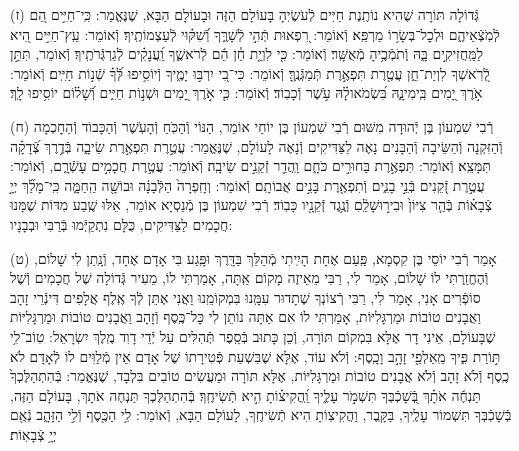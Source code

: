 \documentclass[twoside, openany, parskip=half, 11pt]{book}
\begin{document}
(ז)
גְּֿדוֹלָה תּוֹרָה שֶׁהִיא נוֹתֶֽנֶת חַיִּים לְֿעֹשֶׂיֽהָ בָּעוֹלָם הַזֶּה וּבָעוֹלָם הַבָּא, שֶׁנֶּאֱמַר: כִּֽי־חַיִּ֣ים הֵ֭ם לְֿמֹֽצְֿאֵיהֶ֑ם וּלְכׇל־בְּשָׂר֥וֹ מַרְפֵּֽא׃ וְֿאוֹמֵר: רִ֭פְאוּת תְּֿהִ֣י לְֿשָׁרֶּ֑ךָ וְֿ֝שִׁקּ֗וּי לְֿעַצְמוֹתֶֽיךָ׃ וְֿאוֹמֵר: עֵֽץ־חַיִּ֣ים הִ֭יא לַמַּֽחֲזִיקִ֣ים בָּ֑הּ וְֽֿתֹמְֿכֶ֥יהָ מְֿאֻשָּֽׁר׃ וְֿאוֹמֵר: כִּ֤י לִוְיַ֤ת חֵ֓ן הֵ֬ם לְֿרֹאשֶׁ֑ךָ וַֽ֝עֲנָקִ֗ים לְֿגַרְגְּֿרֹתֶֽיךָ׃ וְֿאוֹמֵר, תִּתֵּ֣ן לְֿ֭רֹֽאשְׁךָ לִוְיַת־חֵ֑ן עֲטֶ֖רֶת תִּפְאֶ֣רֶת תְּֿמַגְּֿנֶֽךָּ׃ וְֿאוֹמֵר: כִּי־בִ֭י יִרְבּ֣וּ יָמֶ֑יךָ וְֿיוֹסִ֥יפוּ לְּֿ֝ךָ֗ שְֿׁנ֣וֹת חַיִּֽים׃ וְֿאוֹמֵר: אֹ֣רֶךְ יָ֭מִים בִּֽימִינָ֑הּ בִּ֝שְׂמֹאולָ֗הּ עֹ֣שֶׁר וְֿכָבֽוֹד׃ וְֿאוֹמֵר: כִּ֤י אֹ֣רֶךְ יָ֭מִים וּשְׁנ֣וֹת חַיִּ֑ים וְֿ֝שָׁל֗וֹם יוֹסִ֥יפוּ לָֽךְ׃

(ח)
רְֿבִי שִׁמְעוֹן בֶּן יְֿהוּדָה מִשּׁוּם רְֿבִי שִׁמְעוֹן בֶּן יוֹחַי אוֹמֵר, הַנּוֹי וְֿהַכֹּֽחַ וְֿהָעֹֽשֶׁר וְֿהַכָּבוֹד וְֿהַחׇכְמָה וְֿהַזִּקְנָה וְֿהַשֵּׂיבָה וְֿהַבָּנִים נָאֶה לַצַּדִּיקִים וְֿנָאֶה לָעוֹלָם, שֶׁנֶּאֱמַר: עֲטֶ֣רֶת תִּפְאֶ֣רֶת שֵׂיבָ֑ה בְּֿדֶ֥רֶךְ צְֿ֝דָקָ֗ה תִּמָּצֵֽא׃ וְֿאוֹמֵר: תִּפְאֶ֣רֶת בַּחוּרִ֣ים כֹּחָ֑ם וַֽהֲדַ֖ר זְֿקֵנִ֣ים שֵׂיבָֽה׃ וְֿאוֹמֵר: עֲטֶ֣רֶת חֲכָמִ֣ים עָשְֿׁרָ֑ם, וְֿאוֹמֵר: עֲטֶ֣רֶת זְֿ֭קֵנִים בְּֿנֵ֣י בָנִ֑ים וְֿתִפְאֶ֖רֶת בָּנִ֣ים אֲבוֹתָֽם׃ וְֿאוֹמֵר: וְחָֽפְרָה֙ הַלְּֿבָנָ֔ה וּבוֹשָׁ֖ה הַֽחַמָּ֑ה כִּֽי־מָלַ֞ךְ יְיָ֣ צְֿבָא֗וֹת בְּֿהַ֤ר צִיּוֹן֙ וּבִיר֣וּשָׁלַֽ֔םִ וְֿנֶ֥גֶד זְֿקֵנָ֖יו כָּבֽוֹד׃ רְֿבִי שִׁמְעוֹן בֶּן מְֿנַסְיָא אוֹמֵר, אֵלּוּ שֶֽׁבַע מִדּוֹת שֶׁמָּנוּ חֲכָמִים לַצַּדִּיקִים, כֻּלָּם נִתְקַיְּֿמוּ בְּֿרַבִּי וּבְבָנָיו:

\vspace{0.5\baselineskip}

(ט)
אָמַר רְֿבִי יוֹסֵי בֶּן קִסְמָא, פַּֽעַם אֶחָת הָיִֽיתִי מְֿהַלֵּךְ בַּדָּֽרֶךְ וּפָּֽגַע בִּי אָדָם אֶחָד, וְֿנָֽתַן לִי שָׁלוֹם, וְֿהֶחֱזַֽרְתִּי לוֹ שָׁלוֹם, אָמַר לִי, רַבִּי מֵאֵיזֶה מָקוֹם אַֽתָּה, אָמַרְתִּי לוֹ, מֵעִיר גְּֿדוֹלָה שֶׁל חֲכָמִים וְֿשֶׁל סוֹפְֿרִים אָנִי, אָמַר לִי, רַבִּי רְֿצוֹנְךָ שֶׁתָדוּר עִמָּֽנוּ בִּמְקוֹמֵֽנוּ וַאֲנִי אֶתֵּן לְֿךָ אֶֽלֶף אֲלָפִים דִּינְֿרֵי זָהָב וַאֲבָנִים טוֹבוֹת וּמַרְגָּלִיּוֹת, אָמַרְתִּי לוֹ אִם אַתָּה נוֹתֵן לִי כׇּל־כֶּֽסֶף וְֿזָהָב וַאֲבָנִים טוֹבוֹת וּמַרְגָּלִיּוֹת שֶׁבָּעוֹלָם, אֵינִי דָר אֶלָּא בִּמְקוֹם תּוֹרָה, וְֿכֵן כָּתוּב בְּֿסֵֽפֶר תְּֿהִלִּים עַל יְֿדֵי דָוִד מֶֽלֶךְ יִשְׂרָאֵל: טֽוֹב־לִ֥י תּ֣וֹרַת פִּ֑יךָ מֵֽאַלְפֵ֖י זָהָ֣ב וָכָֽסֶף: וְֿלֹא עוֹד, אֶלָּא שֶׁבִּשְׁעַת פְּֿטִירָתוֹ שֶׁל אָדָם אֵין מְֿלַוִּים לוֹ לְֿאָדָם לֹא כֶֽסֶף וְֿלֹא זָהָב וְֿלֹא אֲבָנִים טוֹבוֹת וּמַרְגָּלִיּוֹת, אֶלָּא תּוֹרָה וּמַעֲשִׂים טוֹבִים בִּלְבָד, שֶׁנֶּאֱמַר: בְּֿהִתְהַלֶּכְךָ֙ תַּנְחֶ֬ה אֹתָ֗ךְ בְּֽֿ֭שָׁכְֿבְּךָ תִּשְׁמֹ֣ר עָלֶ֑יךָ וַֽ֝הֲקִיצ֗וֹתָ הִ֣יא תְֿשִׂיחֶֽךָ׃ בְּֿהִתְהַלֶּכְךָ תַּנְחֶה אֹתָךְ, בָּעוֹלָם הַזֶּה, בְּֿשָׁכְֿבְּךָ תִּשְׁמוֹר עָלֶֽיךָ, בַּקָּֽבֶר, וַהֲקִיצֽוֹתָ הִיא תְֿשִׂיחֶֽךָ, לָעוֹלָם הַבָּא, וְֿאוֹמֵר: לִ֥י הַכֶּ֖סֶף וְֿלִ֣י הַזָּהָ֑ב נְֿאֻ֖ם יְיָ֥ צְֿבָאֽוֹת׃
\end{document}
